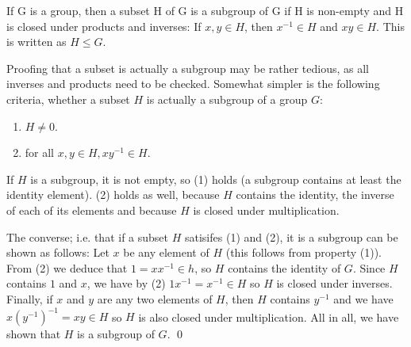 

\begin{definition}[Subgroup]
  If G is a group, then a subset H of G is a subgroup of G if H is non-empty and H is closed under products and inverses: If $x,y \in H$, then $x^{-1} \in H$ and $xy \in H$. This is written as $H \leq G$.
\end{definition}

Proofing that a subset is actually a subgroup may be rather tedious, as all inverses and products need to be checked. Somewhat simpler is the following criteria, whether a subset $H$ is actually a subgroup of a group $G$:

\begin{enumerate}
    \item $H \neq 0$.
    \item for all $x,y \in H, xy^{-1} \in H$.
\end{enumerate}

If $H$ is a subgroup, it is not empty, so (1) holds (a subgroup contains at least the identity element). (2) holds as well, because $H$ contains the identity, the inverse of each of its elements and because $H$ is closed under multiplication.

The converse; i.e. that if a subset $H$ satisifes (1) and (2), it is a subgroup can be shown as follows: Let $x$ be any element of $H$ (this follows from property (1)). From (2) we deduce that $1 = xx^{-1} \in h$, so $H$ contains the identity of $G$. Since $H$ contains $1$ and $x$, we have by (2) $1 x^{-1} = x^{-1} \in H$ so $H$ is closed under inverses. Finally, if $x$ and $y$ are any two elements of $H$, then $H$ contains $y^{-1}$ and we have $x(y^{-1})^{-1} = xy \in H$ so $H$ is also closed under multiplication. All in all, we have shown that $H$ is a subgroup of $G$. \qed
